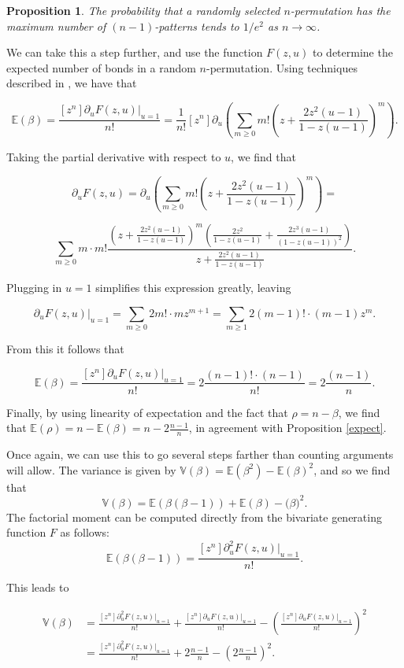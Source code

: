 \documentclass[11pt]{article}
\theoremstyle{plain}
\newtheorem{prop}[thm]{Proposition}
\theoremstyle{definition}
\newcommand{\Ex}{\mathbb{E}(\beta)}
\newcommand{\Em}{\mathbb{E}(\rho)}
\newcommand{\Exs}{\mathbb{E}(\beta ^2)}
\newcommand{\Vx}{\mathbb{V}(\beta)}
\def\ds{\displaystyle}
\begin{document}
  \begin{prop} 
  The probability that a randomly selected $n$-permutation has the maximum
  number of $(n-1)$-patterns tends to $1/e^2$ as $n \rightarrow \infty$.  
  \end{prop}



  We can take this a step further, and use the function $F(z,u)$ to determine the
  expected number of bonds in a random $n$-permutation. Using techniques
  described in \cite{flajolet}, we have that 

  $$ \Ex = \frac{[z^n] \partial_u F(z,u) |_{u=1}}{n!} = \frac{1}{n!}[z^n]
  \partial_u \left( \sum_{m\geq 0} m!\left(z+\frac{2z^2(u-1)}{1-z(u-1)}\right)^m
  \right). $$  
   
  Taking the partial derivative with respect to $u$, we find that 

  $$\partial_u F(z,u) = \partial_u \left( \sum_{m\geq 0} m!\left(
  z+\frac{2z^2(u-1)}{1-z(u-1)} \right)^m \right) = $$

  $$
  \sum_{m\geq 0} m \cdot m! \frac{ \left(\ds z+ \frac{2z^2(u-1)}{1-z(u-1)}
  \right)^m \left( \ds \frac{2z^2}{1-z(u-1)} + \frac{2z^3(u-1)}{(1-z(u-1))^2}
  \right) }{\ds z+ \frac{2z^2(u-1)}{1-z(u-1)}}.$$

  Plugging in $u=1$ simplifies this expression greatly, leaving

  $$\partial_u F(z,u)|_{u=1} =  \sum_{m \geq 0} 2m! \cdot m z^{m+1} = 
  \sum_{m\geq 1} 2(m-1)! \cdot (m-1) z^m .$$

  From this it follows that 

  $$\Ex = \frac{[z^n] \partial_u F(z,u) |_{u=1}}{n!} 
  = 2\frac{(n-1)! \cdot (n-1)}{n!} 
  = 2\frac{(n-1)}{n}.$$

  Finally, by using linearity of expectation and the fact that $\rho = n-
  \beta$,
  we find that $\Em = n - \Ex = n - 2\frac{n-1}{n}$, in agreement with Proposition
  \ref{expect}.

  Once again, we can use this to go several steps farther than counting
  arguments will allow. 
  The variance is given by $\Vx = \Exs - \Ex ^2$, and so we
  find that $$ \Vx = \mathbb{E}(\beta(\beta - 1)) + \mathbb{E}(\beta) -
  \mathbb(\beta)^2.$$ The factorial moment can be computed directly from the
  bivariate generating function $F$ as follows:
  $$\mathbb{E}(\beta (\beta - 1)) = \frac{[z^n] \partial_u ^2 F(z,u)
  |_{u=1}}{n!}.$$ 

  This leads to 

  $$ \begin{aligned} \Vx 
    &= \frac{[z^n] \partial_u ^2 F(z,u)
  |_{u=1}}{n!} +\frac{[z^n] \partial_u F(z,u) |_{u=1}}{n!} - \left(\frac{[z^n]
  \partial_u  F(z,u) |_{u=1}}{n!} \right) ^2 \\ 
    &= \frac{[z^n] \partial_u ^2
  F(z,u) |_{u=1}}{n!} + 2\frac{n-1}{n} - \left( 2 \frac{n-1}{n} \right) ^2.
  \end{aligned} $$
\end{document}
